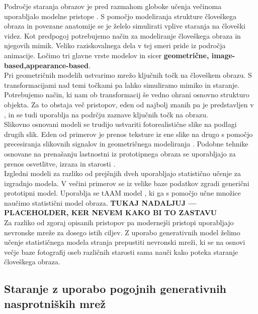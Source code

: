 \documentclass[12pt,a4paper,twoside]{article}
\theoremstyle{definition} %
\theoremstyle{plain} %
\numberwithin{equation}{section}  %
\begin{document}
Področje staranja obrazov je pred razmahom globoke učenja večinoma uporabljalo modelne pristope \cite{fu2010age}. S pomočjo modeliranja strukture človeškega obraza in povezane anatomije se je želelo simulirati vplive staranja na človeški videz. 
Kot predpogoj potrebujemo način za modeliranje človeškega obraza in njegovih mimik. Veliko raziskovalnega dela v tej smeri pride iz področja animacije.  Ločimo tri glavne vrste modelov in sicer \textbf{geometrične, image-based,appearance-based}. 
\\Pri geometričnih modelih ustvarimo mrežo ključnih točk na človeškem obrazu. S transformacijami nad temi točkami pa lahko simuliramo mimiko in staranje. Potrebujemo način, ki nam ob transformacij še vedno ohrani osnovno strukturo objekta. 
Za to obstaja  več pristopov, eden od najbolj znanih pa je predstavljen v  \cite{cootes1995active}, in se tudi uporablja na podrčju zaznave ključnih točk na obrazu. 
\\
Slikovno osnovani modeli se trudijo ustvariti fotorealistične slike na podlagi drugih slik. Eden od primerov je prenos teksture iz ene slike na drugo s pomočjo precesiranja slikovnih signalov in geometričnega modeliranja \cite{liu2004image}. 
Podobne tehnike osnovane na prenašanju lastnostni iz prototipnega obraza se uporabljajo za prenos osvetlitve, izraza in starosti \cite{fu2006m}.
\\
Izgledni modeli  za razliko od prejšnjih dveh uporabljajo statistično učenje za izgradnjo modela. V večini primerov se iz velike baze podatkov zgradi generični prototipni model.   Uporablja se tAAM model \cite{cootes2001active}, ki ga s pomočjo učne množice naučimo
statistični model obraza. 
 \textbf{TUKAJ NADALJUJ --- PLACEHOLDER, KER NEVEM KAKO BI TO ZASTAVU} 
 \\
 
 Za razliko od zgoraj opisanih pristopov pa modernejši pristopi uporabljajo nevronske mreže za dosego istih ciljev.  Z uporabo generativnih model želimo učenje statističnega modela stranja prepustiti nevronski mreži, ki se na osnovi večje baze fotografij oseb različnih starosti 
 sama nauči kako poteka staranje človeškega obraza. 
\subsection{Staranje z uporabo pogojnih generativnih nasprotniških mrež}
 
\end{document}
